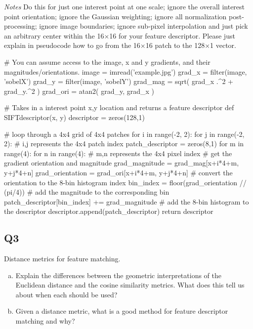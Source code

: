 \documentclass{article}
\begin{document}
\emph{Notes} Do this for just one interest point at one scale; ignore the overall interest point orientation; ignore the Gaussian weighting; ignore all normalization post-processing; ignore image boundaries; ignore sub-pixel interpolation and just pick an arbitrary center within the 16$\times$16 for your feature descriptor. Please just explain in pseudocode how to go from the 16$\times$16 patch to the 128$\times$1 vector.
\begin{python}
    # You can assume access to the image, x and y gradients, and their magnitudes/orientations.
    image = imread('example.jpg')
    grad_x = filter(image, 'sobelX')
    grad_y = filter(image, 'sobelY')
    grad_mag = sqrt( grad_x .^2 + grad_y.^2 )
    grad_ori = atan2( grad_y, grad_x )
    
    # Takes in a interest point x,y location and returns a feature descriptor
    def SIFTdescriptor(x, y)
        descriptor = zeros(128,1)

        # loop through a 4x4 grid of 4x4 patches
        for i in range(-2, 2):
            for j in range(-2, 2):
                # i,j represents the 4x4 patch index
                patch_descriptor = zeros(8,1)
                for m in range(4):
                    for n in range(4):
                        # m,n represents the 4x4 pixel index
                        # get the gradient orientation and magnitude
                        grad_magnitude = grad_mag[x+i*4+m, y+j*4+n]
                        grad_orientation = grad_ori[x+i*4+m, y+j*4+n]
                        # convert the orientation to the 8-bin histogram index
                        bin_index = floor(grad_orientation // (pi/4))
                        # add the magnitude to the corresponding bin
                        patch_descriptor[bin_index] += grad_magnitude
                # add the 8-bin histogram to the descriptor
                descriptor.append(patch_descriptor)
        return descriptor
    \end{python}
    
\subsection{Q3} Distance metrics for feature matching.

\begin{enumerate}[(a)]
    \item Explain the differences between the geometric interpretations of the Euclidean distance and the cosine similarity metrics. What does this tell us about when each should be used?
    \item Given a distance metric, what is a good method for feature descriptor matching and why?
\end{enumerate}
\end{document}
